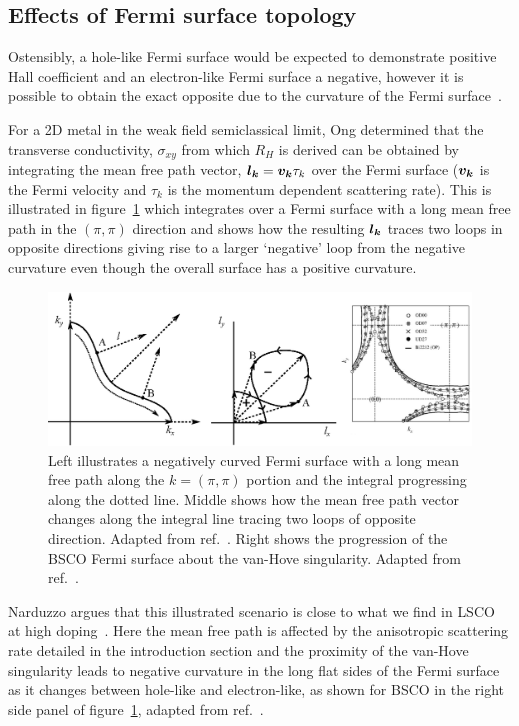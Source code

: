 \subsection{Effects of Fermi surface topology}
    \label{Sec:Theo:TopologyEffects}

Ostensibly, a hole-like Fermi surface would be expected to demonstrate positive Hall coefficient and an electron-like Fermi surface a negative, however it is possible to obtain the exact opposite due to the curvature of the Fermi surface~\cite{Narduzzo2008}. 

For a 2D metal in the weak field semiclassical limit, Ong determined that the transverse conductivity, $\sigma_{xy}$ from which $R_H$ is derived can be obtained by integrating the mean free path vector, $\boldsymbol{l_k} = \boldsymbol{v_k}\tau_k$ over the Fermi surface ($\boldsymbol{v_k}$ is the Fermi velocity and $\tau_k$ is the momentum dependent scattering rate). This is illustrated in figure~\ref{Fig:Theo:NegativeCurvatureLSCO} which integrates over a Fermi surface with a long mean free path in the $(\pi, \pi)$ direction and shows how the resulting $\boldsymbol{l_k}$ traces two loops in opposite directions giving rise to a larger `negative' loop from the negative curvature even though the overall surface has a positive curvature.
\begin{figure}[htbp]
    \begin{center}
        \includegraphics[scale=0.9]{Chapter-Theory/Figures/NegativeCurvatureLSCO/NegativeCurvatureLSCO}
        \caption{Left illustrates a negatively curved Fermi surface with a long mean free path along the $k = (\pi, \pi)$ portion and the integral progressing along the dotted line. Middle shows how the mean free path vector changes along the integral line tracing two loops of opposite direction. Adapted from ref.~\cite{Narduzzo2008}. Right shows the progression of the \ac{BSCO} Fermi surface about the van-Hove singularity. Adapted from ref.~\cite{Kondo2004}.}
        \label{Fig:Theo:NegativeCurvatureLSCO}
    \end{center}
\end{figure}
Narduzzo \etal{} argues that this illustrated scenario is close to what we find in \ac{LSCO} at high doping~\cite{Narduzzo2008}. Here the mean free path is affected by the anisotropic scattering rate detailed in the introduction section and the proximity of the van-Hove singularity leads to negative curvature in the long flat sides of the Fermi surface as it changes between hole-like and electron-like, as shown for \ac{BSCO} in the right side panel of figure~\ref{Fig:Theo:NegativeCurvatureLSCO}, adapted from ref.~\cite{Kondo2004}.

